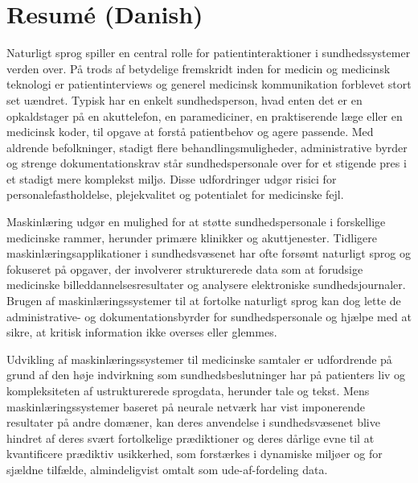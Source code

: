 
\chapter[resumé (danish)]{Resumé (Danish)}

Naturligt sprog spiller en central rolle for patientinteraktioner i sundhedssystemer verden over. 
På trods af betydelige fremskridt inden for medicin og medicinsk teknologi er patientinterviews og generel medicinsk kommunikation forblevet stort set uændret. Typisk har en enkelt sundhedsperson, hvad enten det er en opkaldstager på en akuttelefon, en paramediciner, en praktiserende læge eller en medicinsk koder, til opgave at forstå patientbehov og agere passende. Med aldrende befolkninger, stadigt flere behandlingsmuligheder, administrative byrder og strenge dokumentationskrav står sundhedspersonale over for et stigende pres i et stadigt mere komplekst miljø. Disse udfordringer udgør risici for personalefastholdelse, plejekvalitet og potentialet for medicinske fejl.

Maskinlæring udgør en mulighed for at støtte sundhedspersonale i forskellige medicinske rammer, herunder primære klinikker og akuttjenester. Tidligere maskinlæringsapplikationer i sundhedsvæsenet har ofte forsømt naturligt sprog og fokuseret på opgaver, der involverer strukturerede data som at forudsige medicinske billeddannelsesresultater og analysere elektroniske sundhedsjournaler. Brugen af maskinlæringssystemer til at fortolke naturligt sprog kan dog lette de administrative- og dokumentationsbyrder for sundhedspersonale og hjælpe med at sikre, at kritisk information ikke overses eller glemmes.

Udvikling af maskinlæringssystemer til medicinske samtaler er udfordrende på grund af den høje indvirkning som sundhedsbeslutninger har på patienters liv og kompleksiteten af ustrukturerede sprogdata, herunder tale og tekst. Mens maskinlæringssystemer baseret på neurale netværk har vist imponerende resultater på andre domæner, kan deres anvendelse i sundhedsvæsenet blive hindret af deres svært fortolkelige prædiktioner og deres dårlige evne til at kvantificere prædiktiv usikkerhed, som forstærkes i dynamiske miljøer og for sjældne tilfælde, almindeligvist omtalt som ude-af-fordeling data.

